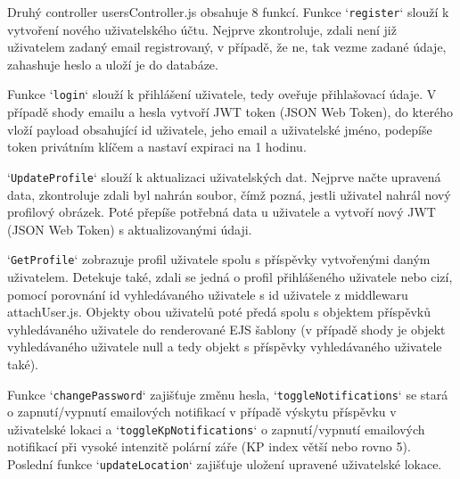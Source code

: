 \par Druhý controller usersController.js obsahuje 8 funkcí. Funkce `\texttt{register}` slouží k vytvoření nového uživatelského účtu. Nejprve zkontroluje, zdali není již uživatelem zadaný email registrovaný, v případě, že ne, tak vezme zadané údaje, zahashuje heslo a uloží je do databáze. 
\par Funkce `\texttt{login}` slouží k přihlášení uživatele, tedy oveřuje přihlašovací údaje. V případě shody emailu a hesla vytvoří JWT token (JSON Web Token), do kterého vloží payload obsahující id uživatele, jeho email a uživatelské jméno, podepíše token privátním klíčem a nastaví expiraci na 1 hodinu.
\par `\texttt{UpdateProfile}` slouží k aktualizaci uživatelských dat. Nejprve načte upravená data, zkontroluje zdali byl nahrán soubor, čímž pozná, jestli uživatel nahrál nový profilový obrázek. Poté přepíše potřebná data u uživatele a vytvoří nový JWT (JSON Web Token) s aktualizovanými údaji.
\par `\texttt{GetProfile}` zobrazuje profil uživatele spolu s příspěvky vytvořenými daným uživatelem. Detekuje také, zdali se jedná o profil přihlášeného uživatele nebo cizí, pomocí porovnání id vyhledávaného uživatele s id uživatele z middlewaru attachUser.js. Objekty obou uživatelů poté předá spolu s objektem příspěvků vyhledávaného uživatele do renderované EJS šablony (v případě shody je objekt vyhledávaného uživatele null a tedy objekt s příspěvky vyhledávaného uživatele také).
\par Funkce `\texttt{changePassword}` zajišťuje změnu hesla, `\texttt{toggleNotifications}` se stará o zapnutí/vypnutí emailových notifikací v případě výskytu příspěvku v uživatelské lokaci a `\texttt{toggleKpNotifications}` o zapnutí/vypnutí emailových notifikací při vysoké intenzitě polární záře (KP index větší nebo rovno 5). Poslední funkce `\texttt{updateLocation}` zajišťuje uložení upravené uživatelské lokace.
